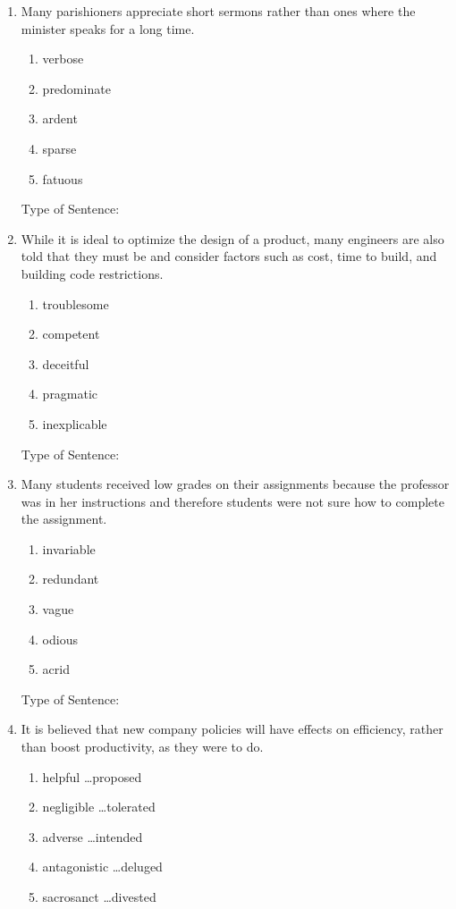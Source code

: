 \begin{enumerate}

\item\sloppy Many parishioners appreciate short sermons rather than \longline ones where the minister speaks for a long time.
\begin{enumerate}[label=(\Alph*)]
\item verbose
\item predominate 
\item ardent 
\item sparse
\item fatuous 
\end{enumerate}

Type of Sentence:\hrulefill

\bigskip
\item While it is ideal to optimize the design of a product, many engineers are also told that they must be \longline and consider factors such as cost, time to build, and building code restrictions. 
\begin{enumerate}[label=(\Alph*)]
\item troublesome
\item competent 
\item deceitful
\item pragmatic
\item inexplicable
\end{enumerate}

Type of Sentence:\hrulefill

\bigskip
\item Many students received low grades on their assignments because the professor was \longline in her instructions and therefore students were not sure how to complete the assignment. 
\begin{enumerate}[label=(\Alph*)]
\item invariable
\item redundant
\item vague
\item odious
\item acrid
\end{enumerate}

Type of Sentence:\hrulefill

\bigskip
\item\sloppy It is believed that new company policies will have \longline effects on efficiency, rather than boost productivity, as they were \longline to do.
\begin{enumerate}[label=(\Alph*)]
\item helpful \ldots proposed
\item negligible \ldots tolerated
\item adverse \ldots intended
\item antagonistic \ldots deluged 
\item sacrosanct \ldots divested 
\end{enumerate}


\end{enumerate}
